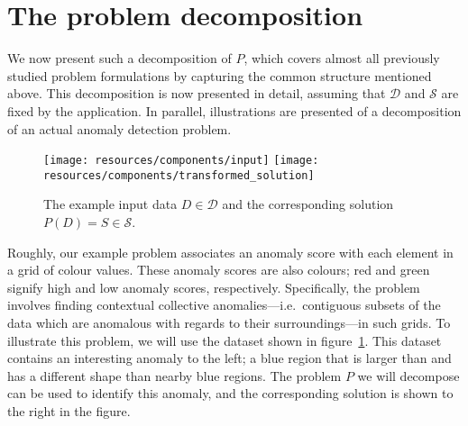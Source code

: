 \newcommand{\exinput}{\texttt{[image: resources/components/input]}}
\newcommand{\extransformedinput}{\texttt{[image: resources/components/transformed\_input]}}
\newcommand{\exevaluationset}{\texttt{[image: resources/components/evaluation\_set]}}
\newcommand{\exevaluationitem}{\texttt{[image: resources/components/evaluation\_item]}}
\newcommand{\excontext}{\texttt{[image: resources/components/context]}}
\newcommand{\exreferenceset}{\texttt{[image: resources/components/reference\_set]}}
\newcommand{\exanomalyscore}{\texttt{[image: resources/components/anomaly\_score]}}
\newcommand{\exanomalyscores}{\texttt{[image: resources/components/anomaly\_scores]}}
\newcommand{\exsolution}{\texttt{[image: resources/components/solution]}}
\newcommand{\extransformedsolution}{\texttt{[image: resources/components/transformed\_solution]}}

\section{The problem decomposition}
\label{sect:data_format}

We now present such a decomposition of $P$, which covers almost all previously studied problem formulations by capturing the common structure mentioned above. This decomposition is now presented in detail, assuming that $\mathcal{D}$ and $\mathcal{S}$ are fixed by the application. In parallel, illustrations are presented of a decomposition of an actual anomaly detection problem.

\begin{figure}[htb]
\begin{center}
\leavevmode
\texttt{[image: resources/components/input]}
\texttt{[image: resources/components/transformed\_solution]}
\end{center}
\caption{\small{The example input data $D \in \mathcal{D}$ and the corresponding solution $P(D) = S \in \mathcal{S}$.}}
\label{fig:input_data}
\end{figure}

Roughly, our example problem associates an anomaly score with each element in a grid of colour values. These anomaly scores are also colours; red and green signify high and low anomaly scores, respectively. Specifically, the problem involves finding contextual collective anomalies---i.e.\ contiguous subsets of the data which are anomalous with regards to their surroundings---in such grids.  To illustrate this problem, we will use the dataset shown in figure~\ref{fig:input_data}. This dataset contains an interesting anomaly to the left; a blue region that is larger than and has a different shape than nearby blue regions. The problem $P$ we will decompose can be used to identify this anomaly, and the corresponding solution is shown to the right in the figure.

